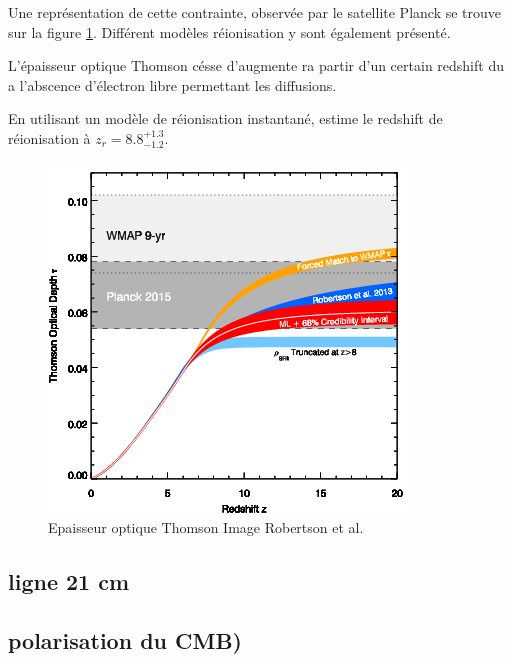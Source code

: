 Une représentation de cette contrainte, observée par le satellite Planck se trouve sur la figure \ref{fig:epaisseur_optique_thomson}.
Différent modèles réionisation y sont également présenté.


L'épaisseur optique Thomson césse d'augmente ra partir d'un certain redshift du a l'abscence d'électron libre permettant les diffusions.



En utilisant un modèle de réionisation instantané, \cite{planck_collaboration_planck_2016} estime le redshift de réionisation à $z_r = 8.8 ^{+1.3}_{-1.2}$.

\begin{figure}[bth]
        \includegraphics[width=.95\linewidth]{img/01/epaisseur_optique_thomson.png} 
        \caption{%
		Epaisseur optique Thomson
        Image Robertson et al.}
 		\label{fig:epaisseur_optique_thomson}
\end{figure}




\subsection{ligne 21 cm}




\subsection{polarisation du CMB)}

